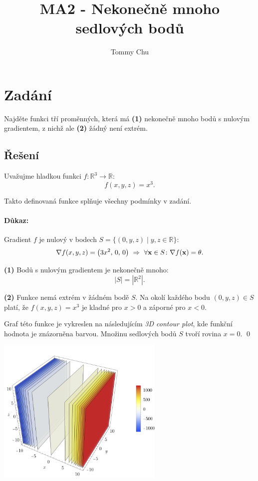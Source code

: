 \documentclass[a4paper]{article}
\title{MA2 - Nekonečně mnoho sedlových bodů}
\author{Tommy Chu}
\date{}
\begin{document}
\maketitle

\section*{Zadání}

Najděte funkci tří proměnných, která má \textbf{(1)} nekonečně mnoho bodů s nulovým gradientem, z nichž ale \textbf{(2)} žádný není extrém.

\subsection*{Řešení}

Uvažujme hladkou funkci $f \colon \mathbb{R}^3 \rightarrow \mathbb{R}$:
\[
    f(x,y,z) = x^3.
\]

Takto definovaná funkce splňuje všechny podmínky v zadání.

\paragraph*{Důkaz:}

Gradient $f$ je nulový v bodech ${ S = \bigl\{ (0,y,z) \mid y,z \in \mathbb{R} \bigr\} }$:
\[
    \nabla f(x,y,z) = \big(3x^2,\, 0,\, 0\big) \ \Rightarrow \
    \forall \vb x \in S \colon \nabla f(\vb x) = \theta.
\]

\textbf{(1)} Bodů s nulovým gradientem je nekonečně mnoho:
\[
    |S| = |\mathbb{R}^2|.
\]

\textbf{(2)} Funkce nemá extrém v žádném bodě $S$. Na okolí každého bodu ${(0,y,z) \in S}$ platí, že ${f(x,y,z) = x^3}$ je kladné pro ${x>0}$ a záporné pro ${x<0}$.

Graf této funkce je vykreslen na následujícím \emph{3D contour plot}, kde funkční hodnota je znázorněna barvou.
Množinu sedlových bodů $S$ tvoří rovina ${x=0}$.
\qed

\begin{center}
    \includegraphics[width=8cm]{f.pdf}
\end{center}
\end{document}
